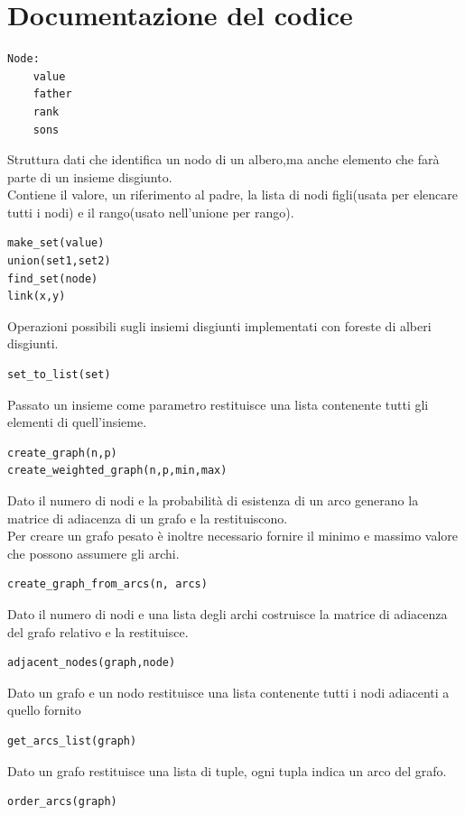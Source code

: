\documentclass[]{article}
\begin{document}
\section{Documentazione del codice}
\begin{verbatim}
Node:
	value
	father
	rank
	sons
\end{verbatim}
Struttura dati che identifica un nodo di un albero,ma anche elemento che farà parte di un insieme disgiunto.\\
Contiene il valore, un riferimento al padre, la lista di nodi figli(usata per elencare tutti i nodi) e il rango(usato nell'unione per rango).\\
\begin{verbatim}
make_set(value)
union(set1,set2)
find_set(node)
link(x,y)
\end{verbatim}
Operazioni possibili sugli insiemi disgiunti implementati con foreste di alberi disgiunti.\\
\begin{verbatim}
set_to_list(set)
\end{verbatim}
Passato un insieme come parametro restituisce una lista contenente tutti gli elementi di quell'insieme.\\
\begin{verbatim}
create_graph(n,p)
create_weighted_graph(n,p,min,max)
\end{verbatim}
Dato il numero di nodi e la probabilità di esistenza di un arco generano la matrice di adiacenza di un grafo e la restituiscono.\\
Per creare un grafo pesato è inoltre necessario fornire il minimo e massimo valore che possono assumere gli archi.\\
\begin{verbatim}
create_graph_from_arcs(n, arcs)
\end{verbatim}
Dato il numero di nodi e una lista degli archi costruisce la matrice di adiacenza del grafo relativo e la restituisce.\\
\begin{verbatim}
adjacent_nodes(graph,node)
\end{verbatim}
Dato un grafo e un nodo restituisce una lista contenente tutti i nodi adiacenti a quello fornito\\
\begin{verbatim}
get_arcs_list(graph)
\end{verbatim}
Dato un grafo restituisce una lista di tuple, ogni tupla indica un arco del grafo.\\
\begin{verbatim}
order_arcs(graph)
\end{verbatim}
\end{document}

